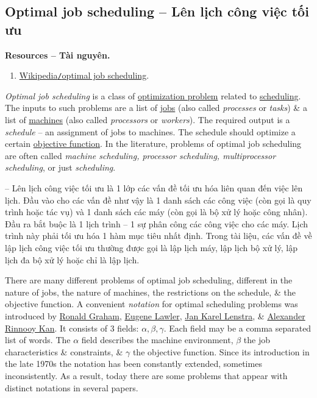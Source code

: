 \documentclass{article}
\begin{document}

\subsection{Optimal job scheduling -- Lên lịch công việc tối ưu}
\textbf{\textbf{Resources -- Tài nguyên.}}
\begin{enumerate}
	\item \href{https://en.wikipedia.org/wiki/Optimal_job_scheduling}{Wikipedia{\tt/}optimal job scheduling}.
\end{enumerate}
{\it Optimal job scheduling} is a class of \href{https://en.wikipedia.org/wiki/Optimization_problem}{optimization problem} related to \href{https://en.wikipedia.org/wiki/Scheduling_(computing)}{scheduling}. The inputs to such problems are a list of \href{https://en.wikipedia.org/wiki/Job_(computing)}{jobs} (also called {\it processes} or {\it tasks}) \& a list of \href{https://en.wikipedia.org/wiki/Processor_(computing)}{machines} (also called {\it processors} or {\it workers}). The required output is a {\it schedule} -- an assignment of jobs to machines. The schedule should optimize a certain \href{https://en.wikipedia.org/wiki/Objective_function}{objective function}. In the literature, problems of optimal job scheduling are often called {\it machine scheduling, processor scheduling, multiprocessor scheduling}, or just {\it scheduling}.

-- Lên lịch công việc tối ưu là 1 lớp các vấn đề tối ưu hóa liên quan đến việc lên lịch. Đầu vào cho các vấn đề như vậy là 1 danh sách các công việc (còn gọi là quy trình hoặc tác vụ) và 1 danh sách các máy (còn gọi là bộ xử lý hoặc công nhân). Đầu ra bắt buộc là 1 lịch trình – 1 sự phân công các công việc cho các máy. Lịch trình này phải tối ưu hóa 1 hàm mục tiêu nhất định. Trong tài liệu, các vấn đề về lập lịch công việc tối ưu thường được gọi là lập lịch máy, lập lịch bộ xử lý, lập lịch đa bộ xử lý hoặc chỉ là lập lịch.

There are many different problems of optimal job scheduling, different in the nature of jobs, the nature of machines, the restrictions on the schedule, \& the objective function. A convenient {\it notation} for optimal scheduling problems was introduced by \href{https://en.wikipedia.org/wiki/Ronald_Graham}{\sc Ronald Graham}, \href{https://en.wikipedia.org/wiki/Eugene_Lawler}{\sc Eugene Lawler}, \href{https://en.wikipedia.org/wiki/Jan_Karel_Lenstra}{\sc Jan Karel Lenstra}, \& \href{https://en.wikipedia.org/wiki/Alexander_Rinnooy_Kan}{\sc Alexander Rinnooy Kan}. It consists of 3 fields: $\alpha,\beta,\gamma$. Each field may be a comma separated list of words. The $\alpha$ field describes the machine environment, $\beta$ the job characteristics \& constraints, \& $\gamma$ the objective function. Since its introduction in the late 1970s the notation has been constantly extended, sometimes inconsistently. As a result, today there are some problems that appear with distinct notations in several papers.
\end{document}

